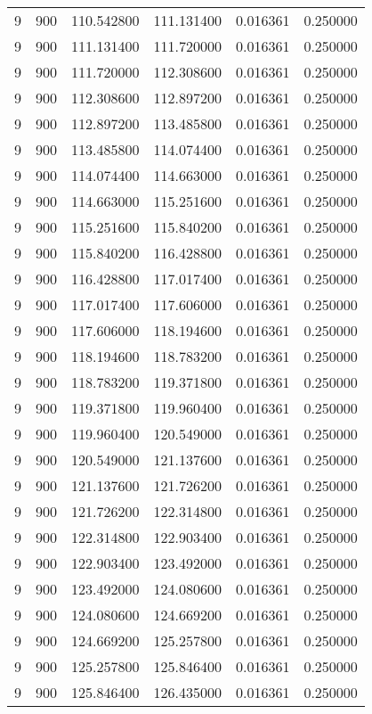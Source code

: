 \begin{longtable}{rrrrrr}
9 & 900 & 110.542800 & 111.131400 & 0.016361 & 0.250000 \\
9 & 900 & 111.131400 & 111.720000 & 0.016361 & 0.250000 \\
9 & 900 & 111.720000 & 112.308600 & 0.016361 & 0.250000 \\
9 & 900 & 112.308600 & 112.897200 & 0.016361 & 0.250000 \\
9 & 900 & 112.897200 & 113.485800 & 0.016361 & 0.250000 \\
9 & 900 & 113.485800 & 114.074400 & 0.016361 & 0.250000 \\
9 & 900 & 114.074400 & 114.663000 & 0.016361 & 0.250000 \\
9 & 900 & 114.663000 & 115.251600 & 0.016361 & 0.250000 \\
9 & 900 & 115.251600 & 115.840200 & 0.016361 & 0.250000 \\
9 & 900 & 115.840200 & 116.428800 & 0.016361 & 0.250000 \\
9 & 900 & 116.428800 & 117.017400 & 0.016361 & 0.250000 \\
9 & 900 & 117.017400 & 117.606000 & 0.016361 & 0.250000 \\
9 & 900 & 117.606000 & 118.194600 & 0.016361 & 0.250000 \\
9 & 900 & 118.194600 & 118.783200 & 0.016361 & 0.250000 \\
9 & 900 & 118.783200 & 119.371800 & 0.016361 & 0.250000 \\
9 & 900 & 119.371800 & 119.960400 & 0.016361 & 0.250000 \\
9 & 900 & 119.960400 & 120.549000 & 0.016361 & 0.250000 \\
9 & 900 & 120.549000 & 121.137600 & 0.016361 & 0.250000 \\
9 & 900 & 121.137600 & 121.726200 & 0.016361 & 0.250000 \\
9 & 900 & 121.726200 & 122.314800 & 0.016361 & 0.250000 \\
9 & 900 & 122.314800 & 122.903400 & 0.016361 & 0.250000 \\
9 & 900 & 122.903400 & 123.492000 & 0.016361 & 0.250000 \\
9 & 900 & 123.492000 & 124.080600 & 0.016361 & 0.250000 \\
9 & 900 & 124.080600 & 124.669200 & 0.016361 & 0.250000 \\
9 & 900 & 124.669200 & 125.257800 & 0.016361 & 0.250000 \\
9 & 900 & 125.257800 & 125.846400 & 0.016361 & 0.250000 \\
9 & 900 & 125.846400 & 126.435000 & 0.016361 & 0.250000 \\

\end{longtable}
